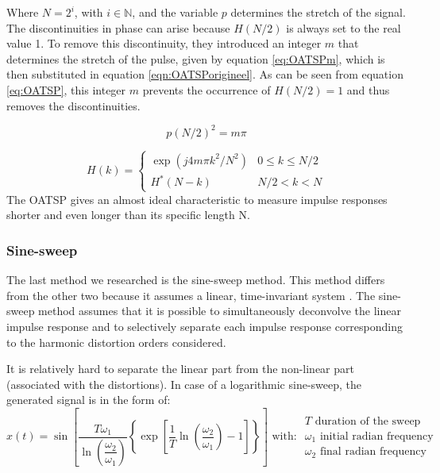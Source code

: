 Where $N=2^{i}$, with $i\in\mathbb{N}$, and the variable $p$ determines the stretch of the signal. 
The discontinuities in phase can arise because $H(N/2)$ is always set to the real value 1. To remove this discontinuity, they introduced an integer $m$ that determines the stretch of the pulse, given by equation \ref{eq:OATSPm}, which is then substituted in equation \ref{eqn:OATSPorigineel}. As can be seen from equation \ref{eq:OATSP}, this integer $m$ prevents the occurrence of $H(N/2) = 1$ and thus removes the discontinuities.

\begin{equation}
p(N/2)^{2} = m \pi
\label{eq:OATSPm}
\end{equation}

\begin{equation}
\label{eq:OATSP}
H(k)=\left\{
\begin{array}{ll}
\exp(j4m \pi k^{2}/N^{2})& 0 \leq k \leq N/2\\
H^{*} (N-k) & N/2 < k < N
\end{array}
\right.
\end{equation}
The OATSP gives an almost ideal characteristic to measure impulse responses shorter and even longer than its specific length N. 

\subsubsection{Sine-sweep}
The last method we researched is the sine-sweep method. This method differs from the other two because it assumes a linear, time-invariant system \cite{Stan2002249}. The sine-sweep method assumes that it is possible to simultaneously deconvolve the linear impulse response and to selectively separate each impulse response corresponding to the harmonic distortion orders considered.

It is relatively hard to separate the linear part from the non-linear part (associated with the distortions). In case of a logarithmic sine-sweep, the generated signal is in the form of:
\[
x(t)=\sin\left[\dfrac{T\omega_1}{\ln\left(\dfrac{\omega_2}{\omega_1}\right)}\left\{\exp\left[\dfrac{1}{T}\ln\left(\dfrac{\omega_2}{\omega_1}\right)-1\right]\right\}\right] \text{ with: }\begin{array}{l}
T \text{ duration of the sweep}\\
\omega_1 \text{ initial radian frequency}\\
\omega_2 \text{ final radian frequency}
\end{array}
\]

